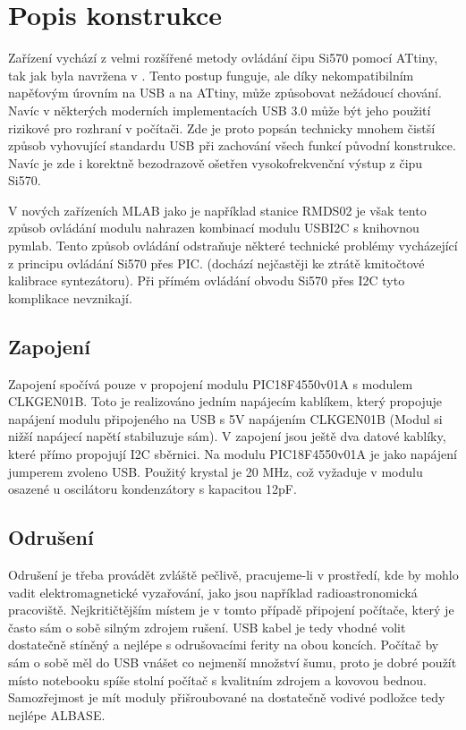 \documentclass[12pt,a4paper,oneside]{article}
\begin{document}
\section{Popis konstrukce}
Zařízení vychází z velmi rozšířené metody ovládání čipu Si570 pomocí ATtiny, tak jak byla navržena v \cite{Si570board}. Tento postup funguje, ale díky nekompatibilním napěťovým úrovním na USB a na ATtiny, může způsobovat nežádoucí chování. Navíc v některých moderních implementacích USB 3.0 může být jeho použití rizikové pro rozhraní v počítači. Zde je proto popsán technicky mnohem čistší způsob vyhovující standardu USB při zachování všech funkcí původní konstrukce.
Navíc je zde i korektně bezodrazově ošetřen vysokofrekvenční výstup z čipu Si570. 

V nových zařízeních MLAB jako je například stanice RMDS02 je však tento způsob ovládání modulu nahrazen kombinací modulu USBI2C \cite{USBI2C} s knihovnou pymlab\cite{pymlab}. Tento způsob ovládání odstraňuje některé technické problémy vycházející z principu ovládání Si570 přes PIC. (dochází nejčastěji ke ztrátě kmitočtové kalibrace syntezátoru). Při přímém ovládání obvodu Si570 přes I2C tyto komplikace nevznikají. 

\subsection{Zapojení}
Zapojení spočívá pouze v propojení modulu PIC18F4550v01A s modulem CLKGEN01B. Toto je realizováno jedním napájecím kablíkem, který propojuje napájení modulu připojeného na USB s 5V napájením CLKGEN01B (Modul si nižší napájecí napětí stabiluzuje sám). V zapojení jsou ještě dva datové kablíky, které přímo propojují I2C sběrnici.
Na modulu PIC18F4550v01A je jako napájení jumperem zvoleno USB. Použitý krystal je 20 MHz, což vyžaduje v modulu osazené u oscilátoru kondenzátory s kapacitou 12pF.

\subsection{Odrušení}

Odrušení je třeba provádět zvláště pečlivě, pracujeme-li v prostředí, kde by mohlo vadit elektromagnetické vyzařování, jako jsou například radioastronomická pracoviště. Nejkritičtějším místem je v tomto případě připojení počítače, který je často sám o sobě silným zdrojem rušení. USB kabel je tedy vhodné volit dostatečně stíněný a nejlépe s odrušovacími ferity na obou koncích. Počítač by sám o sobě měl do USB vnášet co nejmenší množství šumu, proto je dobré použít místo notebooku spíše stolní počítač s kvalitním zdrojem a kovovou bednou. Samozřejmost je mít moduly přišroubované na dostatečně vodivé podložce tedy nejlépe ALBASE.  
\end{document}
